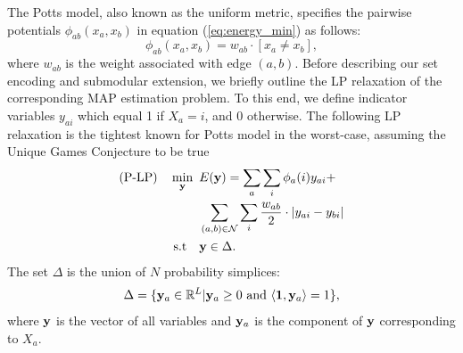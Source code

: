 
The Potts model, also known as the uniform metric, specifies the pairwise potentials $\phi_{ab}(x_a, x_b)$ in equation (\ref{eq:energy_min}) as follows:
\begin{equation}
    \phi_{ab}(x_a, x_b) = w_{ab} \cdot [x_a \neq x_b],
\end{equation}
where $w_{ab}$ is the weight associated with edge $(a, b)$. 
%
 Before describing our set encoding and submodular extension, we briefly outline the LP relaxation of the corresponding MAP estimation problem. To this end, we define indicator variables $y_{ai}$ which equal 1 if $X_a = i$, and 0 otherwise. The following LP relaxation is the tightest known for Potts model in the worst-case, assuming the Unique Games Conjecture to be true \citep{manokaran2008sdp}
\begin{align}
    \text{(P-LP)} \quad \min_{\bf y} \enskip & E({\bf y}) =  \sum_{a} \sum_{i} \phi_a(i)y_{ai} + \nonumber\\
     &\sum_{(a, b) \in {\mathcal N}} \sum_{i} \frac{w_{ab}}{2} \cdot |y_{ai} - y_{bi}| \nonumber\\
    \text{s.t} \quad &{\bf y} \in \Delta.
\label{eq:p-lp}
\end{align}
The set $\Delta$ is the union of $N$ probability simplices:
\begin{equation}
    \Delta = \{{\bf y}_a \in \mathbb{R}^L | {\bf y}_a \geq 0  \textrm{ and } \langle {\bf 1}, {\bf y}_a \rangle = 1\},
    \label{eq:delta}
\end{equation}
where $\bf y$ is the vector of all variables and ${\bf y}_a$ is the component
of $\bf y$ corresponding to $X_a$.


